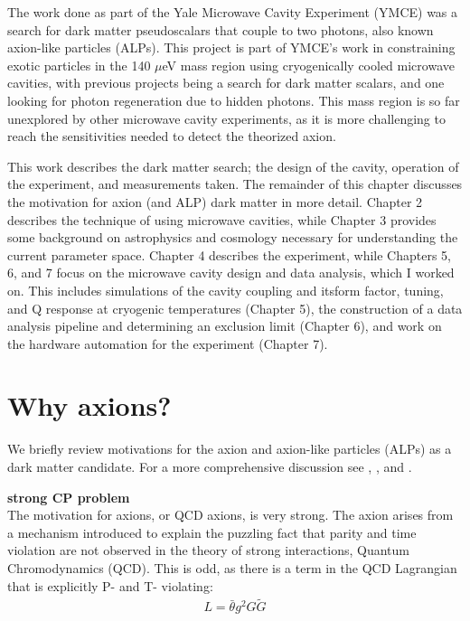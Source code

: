 \documentclass[12pt,twosides]{book}
\begin{document}
The work done as part of the Yale Microwave Cavity Experiment (YMCE) was a search for dark matter pseudoscalars that couple to two photons, also known axion-like particles (ALPs). This project is part of YMCE's work in constraining exotic particles in the 140 $\mu$eV mass region using cryogenically cooled microwave cavities, with previous projects being a search for dark matter scalars, and one looking for photon regeneration due to hidden photons. This mass region is so far unexplored by other microwave cavity experiments, as it is more challenging to reach the sensitivities needed to detect the theorized axion.

This work describes the dark matter search; the design of the cavity, operation of the experiment, and measurements taken. The remainder of this chapter discusses the motivation for axion (and ALP) dark matter in more detail. Chapter 2 describes the technique of using microwave cavities, while Chapter 3 provides some background on astrophysics and cosmology necessary for understanding the current parameter space. Chapter 4 describes the experiment, while Chapters 5, 6, and 7 focus on the microwave cavity design and data analysis, which I worked on. This includes simulations of the cavity coupling and itsform factor, tuning, and Q response at cryogenic temperatures (Chapter 5), the construction of a data analysis pipeline and determining an exclusion limit (Chapter 6), and work on the hardware automation for the experiment (Chapter 7).

\section{Why axions?}

We briefly review motivations for the axion and axion-like particles (ALPs) as a dark matter candidate. For a more comprehensive discussion see \cite{hewett12}, \cite{arias12}, and \cite{kim87}. 


 \textbf{strong CP problem} \hfill \\

The motivation for axions, or QCD axions, is very strong. The axion arises from a mechanism introduced to explain the puzzling fact that parity and time violation are not observed in the theory of strong interactions, Quantum Chromodynamics (QCD). This is odd, as there is a term in the QCD Lagrangian that is explicitly P- and T- violating:
\begin{align*}
L = \bar \theta g^2 G \tilde G
\end{align*}
\end{document}
